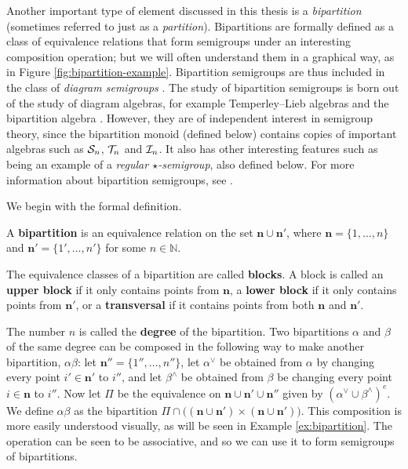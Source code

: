 Another important type of element discussed in this thesis is a
\textit{bipartition} (sometimes referred to just as a \textit{partition}).
Bipartitions are formally defined as a class of equivalence relations that form
semigroups under an interesting composition operation; but we will often
understand them in a graphical way, as in Figure \ref{fig:bipartition-example}.
Bipartition semigroups are thus included in the class of \textit{diagram
  semigroups} \cite{diagram_semigroups}.  The study of bipartition semigroups is
born out of the study of diagram algebras, for example Temperley--Lieb algebras
and the bipartition algebra \cite{partition_algebra}.  However, they are of
independent interest in semigroup theory, since the bipartition monoid (defined
below) contains copies of important algebras such as $\mathcal{S}_n$, $\mathcal{T}_n$ and
$\mathcal{I}_n$.  It also has other interesting features such as being an example of a
\textit{regular $\star$-semigroup}, also defined below.  For more information
about bipartition semigroups, see \cite[\S1]{deg_motzkin}.

We begin with the formal definition.

\begin{definition}
  \label{def:bipartition}
  A \textbf{bipartition} is an equivalence relation on the set
  $\mathbf{n} \cup \mathbf{n}'$, where $\mathbf{n} = \{1, \ldots, n\}$ and
  $\mathbf{n}' = \{1', \ldots, n'\}$ for some $n \in \mathbb{N}$.
\end{definition}

The equivalence classes of a bipartition are called \textbf{blocks}.  A block is
called an \textbf{upper block} if it only contains points from $\mathbf{n}$, a
\textbf{lower block} if it only contains points from $\mathbf{n}'$, or a
\textbf{transversal} if it contains points from both $\mathbf{n}$ and
$\mathbf{n}'$.

The number $n$ is called the \textbf{degree} of the
bipartition.   Two
bipartitions $\alpha$ and $\beta$ of the same degree can be composed in the
following way to make another bipartition, $\alpha \beta$: let
$\mathbf{n}'' = \{1'', \ldots, n''\}$, let $\alpha^\vee$ be obtained from
$\alpha$ by changing every point $i' \in \mathbf{n}'$ to $i''$, and let
$\beta^\wedge$ be obtained from $\beta$ be changing every point
$i \in \mathbf{n}$ to $i''$.  Now let $\Pi$ be the equivalence on
$\mathbf{n} \cup \mathbf{n}' \cup \mathbf{n}''$ given by
$(\alpha^\vee \cup \beta^\wedge)^e$.  We define $\alpha \beta$ as the
bipartition
$\Pi \cap \big((\mathbf{n} \cup \mathbf{n}') \times (\mathbf{n} \cup
\mathbf{n}')\big)$.  This composition is more easily understood visually, as
will be seen in Example \ref{ex:bipartition}.  The operation can be seen to be
associative, and so we can use it to form semigroups of bipartitions.

